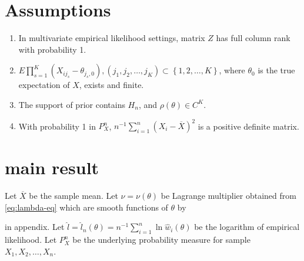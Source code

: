 \section{Assumptions}
\begin{enumerate}
\item \label{enu:multv-diff-full-rank}In multivariate empirical likelihood
settings, matrix $Z$ has full column rank with probability 1. %
\begin{comment}
brief discussion the stat meaning of assumption
\end{comment}

\item \label{enu:finite-moment-sample}$E\prod_{s=1}^{K}\left(X_{ij_{s}}-\theta_{j_{s},0}\right),\left(j_{1},j_{2},\ldots,j_{K}\right)\subset\left\{ 1,2,\ldots,K\right\} $,
where $\theta_{0}$ is the true expectation of $X$, exists and finite.
\begin{comment}
need a math induction lemma for finiteness of constant, need to be
more specified
\end{comment}
\begin{comment}
need a uniform bounded
\end{comment}

\item \label{enu:smooth-piror}The support of prior contains $H_{n}$, and
$\rho\left(\theta\right)\in C^{K}$. 
\item \label{enu:pd-sample-var}With probability 1 in $P_{X}^{n}$, $n^{-1}\sum_{i=1}^{n}\left(X_{i}-\overline{X}\right)^{2}$
is a positive definite matrix. 
\end{enumerate}

\section{main result\label{sec:main-result}}

Let $\overline{X}$ be the sample mean. Let $\nu=\nu\left(\theta\right)$
be Lagrange multiplier obtained from \ref{eq:lambda-eq} which are
smooth functions of $\theta$ by %
\begin{comment}
smooth lemma
\end{comment}
{} in appendix. Let $\hat{l}=\hat{l}_{n}\left(\theta\right)=n^{-1}\sum_{i=1}^{n}\ln\hat{w}_{i}\left(\theta\right)$
be the logarithm of empirical likelihood. Let $P_{X}^{n}$ be the
underlying probability measure for sample $X_{1},X_{2},\ldots,X_{n}$. 

